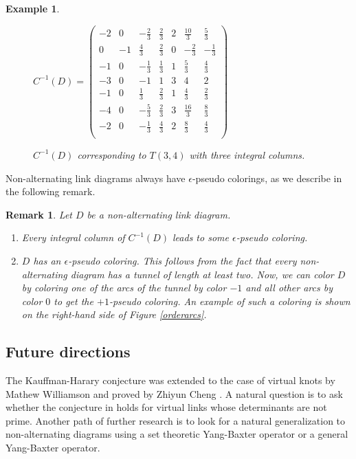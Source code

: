 \documentclass[11pt]{amsart}
\newtheorem{example}[theorem]{Example}
\newtheorem{remark}[theorem]{Remark}
\begin{document}
\begin{example}
\setlength{\tabcolsep}{20pt}
\renewcommand{\arraystretch}{1.5}
\begin{figure}[ht]
$\displaystyle C^{-1}(D)=\displaystyle \left(
\begin{array}{rrrrrrr}
 -2 & 0 & -\frac{2}{3} & \frac{2}{3} & 2 & \frac{10}{3} & \frac{5}{3} \\
 0 & -1 & \frac{4}{3} & \frac{2}{3} & 0 & -\frac{2}{3} & -\frac{1}{3} \\
 -1 & 0 & -\frac{1}{3} & \frac{1}{3} & 1 & \frac{5}{3} & \frac{4}{3} \\
 -3 & 0 & -1 & 1 & 3 & 4 & 2 \\
 -1 & 0 & \frac{1}{3} & \frac{2}{3} & 1 & \frac{4}{3} & \frac{2}{3} \\
 -4 & 0 & -\frac{5}{3} & \frac{2}{3} & 3 & \frac{16}{3} & \frac{8}{3} \\
 -2 & 0 & -\frac{1}{3} & \frac{4}{3} & 2 & \frac{8}{3} & \frac{4}{3} \\
\end{array}
\right)$
\caption{$C^{-1}(D)$ corresponding to $T(3,4)$ with three integral columns.}
\label{CMatrix819}
\end{figure}
\end{example}

Non-alternating link diagrams always have $\epsilon$-pseudo colorings, as we describe in the following remark.

\begin{remark}\label{remarkpseudo} 
Let $D$ be a non-alternating link diagram.

\begin{enumerate}

\item[(1)] Every integral column of $C^{-1}(D)$ leads to some $\epsilon$-pseudo coloring.

\item[(2)] $D$ has an  $\epsilon$-pseudo coloring. This follows from the fact that every non-alternating diagram has a tunnel of length at least two. Now, we can color $D$ by coloring one of the arcs of the tunnel by color $-1$ and all other arcs by color $0$ to get the $+1$-pseudo coloring. An example of such a coloring is shown on the right-hand side of Figure \ref{orderarcs}.
\end{enumerate}

\end{remark}

\subsection{Future directions}
The Kauffman-Harary conjecture was extended to the case of virtual knots by Mathew Williamson \cite{Wil} and proved by Zhiyun Cheng \cite{Che}. A natural question is to ask whether the conjecture in \cite{APS} holds for virtual links whose determinants are not prime. Another path of further research is to look for a natural generalization to non-alternating diagrams using a set theoretic Yang-Baxter operator or a general Yang-Baxter operator. 
\end{document}
